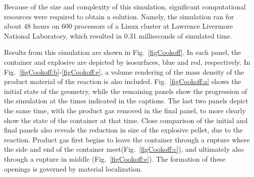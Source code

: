 Because of the size and complexity of this simulation, significant
computational resources were required to obtain a solution.  Namely,
the simulation ran for about 48 hours on 600 processors of a Linux
cluster at Lawrence Livermore National Laboratory, which resulted in
0.31 milliseconds of simulated time.

Results from this simulation are shown in Fig.~\ref{figCookoff}.  In
each panel, the container and explosive are depicted by isosurfaces,
blue and red, respectively.  In Fig.~\ref{figCookoff:b}-\ref{figCookoff:e},
a volume rendering of the mass density of the product material of the
reaction is also included.  Fig.~\ref{figCookoff:a} shows the initial
state of the geometry, while the remaining panels show the progression
of the simulation at the times indicated in the captions.  The last
two panels depict the same time, with the product gas removed in the
final panel, to more clearly show the state of the container at that
time.  Close comparison of the initial and final panels also reveals
the reduction in size of the explosive pellet, due to the reaction.
Product gas first begins to leave the container through a
rupture where the side and end of the container
meet(Fig.~\ref{figCookoff:c}), and ultimately
also through a rupture in middle (Fig.~\ref{figCookoff:e}).  The
formation of these openings is governed by material localization.

